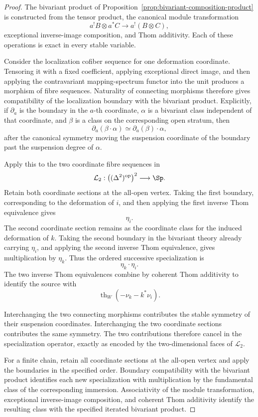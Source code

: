 \begin{proof}
The bivariant product of
Proposition~\ref{prop:bivariant-composition-product} is constructed from
the tensor product, the canonical module transformation
\[
    a^!B\otimes a^*C
    \longrightarrow
    a^!(B\otimes C),
\]
exceptional inverse-image composition, and Thom additivity.  Each of these
operations is exact in every stable variable.

Consider the localization cofiber sequence for one deformation coordinate.
Tensoring it with a fixed coefficient, applying exceptional direct image,
and then applying the contravariant mapping-spectrum functor into the unit
produces a morphism of fibre sequences.  Naturality of connecting morphisms
therefore gives compatibility of the localization boundary with the
bivariant product.  Explicitly, if \(\partial_a\) is the boundary in the
\(a\)-th coordinate, \(\alpha\) is a bivariant class independent of that
coordinate, and \(\beta\) is a class on the corresponding open stratum,
then
\[
    \partial_a(\beta\cdot\alpha)
    \simeq
    \partial_a(\beta)\cdot\alpha,
\]
after the canonical symmetry moving the suspension coordinate of the
boundary past the suspension degree of \(\alpha\).

Apply this to the two coordinate fibre sequences in
\[
    \mathcal L_2:
    \bigl((\Delta^2)^{\mathrm{op}}\bigr)^2
    \longrightarrow
    \Sp.
\]
Retain both coordinate sections at the all-open vertex.  Taking the first
boundary, corresponding to the deformation of \(i\), and then applying the
first inverse Thom equivalence gives
\[
    \eta_i.
\]
The second coordinate section remains as the coordinate class for the
induced deformation of \(k\).  Taking the second boundary in the bivariant
theory already carrying \(\eta_i\), and applying the second inverse Thom
equivalence, gives multiplication by \(\eta_k\).  Thus the ordered
successive specialization is
\[
    \eta_k\cdot\eta_i.
\]
The two inverse Thom equivalences combine by coherent Thom additivity to
identify the source with
\[
    \operatorname{th}_W(-\nu_k-k^*\nu_i).
\]

Interchanging the two connecting morphisms contributes the stable symmetry
of their suspension coordinates.  Interchanging the two coordinate
sections contributes the same symmetry.  The two contributions therefore
cancel in the specialization operator, exactly as encoded by the
two-dimensional faces of \(\mathcal L_2\).

For a finite chain, retain all coordinate sections at the all-open vertex
and apply the boundaries in the specified order.  Boundary compatibility
with the bivariant product identifies each new specialization with
multiplication by the fundamental class of the corresponding immersion.
Associativity of the module transformation, exceptional inverse-image
composition, and coherent Thom additivity identify the resulting class
with the specified iterated bivariant product.
\end{proof}

